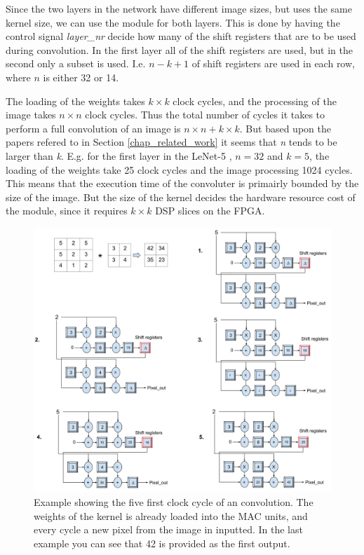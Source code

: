 Since the two layers in the network have different image sizes, but uses the same kernel size, we can use the module for both layers. This is done by having the control signal \textit{layer\_nr} decide how many of the shift registers that are to be used during convolution. In the first layer all of the shift registers are used, but in the second only a subset is used. I.e. $ n-k+1 $ of shift registers are used in each row, where $ n $ is either 32 or 14. 

The loading of the weights takes $ k \times k $ clock cycles, and the processing of the image takes $ n \times n $ clock cycles. Thus the total number of cycles it takes to perform a full convolution of an image is $ n \times n + k \times k $. But based upon the papers refered to in Section \ref{chap_related_work} it seems that \textit{n} tends to be larger than \textit{k}. E.g. for the first layer in the LeNet-5 \cite{LeCun1998}, $ n = 32 $ and $ k = 5 $, the loading  of the weights take 25 clock cycles and the image processing 1024 cycles. This means that the execution time of the convoluter is primairly bounded by the size of the image. But the size of the kernel decides the hardware resource cost of the module, since it requires $ k \times k $ DSP slices on the FPGA.

\begin{figure}[h!]
  \centering
      \includegraphics[width=1.1\textwidth]{Figures/Method/Conv_example}
  \caption[Convolution example]{Example showing the five first clock cycle of an convolution. The weights of the kernel is already loaded into the MAC units, and every cycle a new pixel from the image in inputted. In the last example you can see that 42 is provided as the first output.}
\end{figure}


